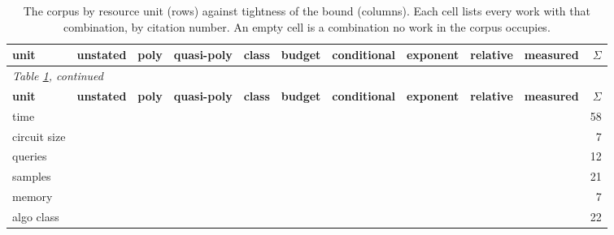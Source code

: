 \begin{landscape}
\begingroup\scriptsize\setlength{\tabcolsep}{3pt}
\begin{longtable}{lp{2.10cm}p{2.10cm}p{2.10cm}p{2.10cm}p{2.10cm}p{2.10cm}p{2.10cm}p{2.10cm}p{2.10cm}r}
\caption{The corpus by resource unit (rows) against tightness of the bound (columns). Each cell lists every work with that combination, by citation number. An empty cell is a combination no work in the corpus occupies.}\label{tab:unit-tightness}\\
\toprule \textbf{unit} & \textbf{unstated} & \textbf{poly} & \textbf{quasi-poly} & \textbf{class} & \textbf{budget} & \textbf{conditional} & \textbf{exponent} & \textbf{relative} & \textbf{measured} & \textbf{$\Sigma$} \\ \midrule\endfirsthead
\multicolumn{11}{l}{\emph{Table \ref{tab:unit-tightness}, continued}}\\
\toprule \textbf{unit} & \textbf{unstated} & \textbf{poly} & \textbf{quasi-poly} & \textbf{class} & \textbf{budget} & \textbf{conditional} & \textbf{exponent} & \textbf{relative} & \textbf{measured} & \textbf{$\Sigma$} \\ \midrule\endhead
\bottomrule\endfoot
time & \cite{ZDKT25} & \cite{BCV16,BJ23,BLPR18,CGH04,CHLX25,CK21,CKMMNST25,DGMRLW24,DKKLMS16,DN03,DNV19,EMM20,GIKKM23,GKVZ22,GKY11,GSVV25,HMST22,HMSTY25,HN23,HW21,KKOSVZ24,LZZ25,MPRV09,MR26,SZB21,Son24,VDKMR26,XSD24,ZSWB22} & \cite{BHJK25} &  & \cite{RV24,ZFWCSXZ26} & \cite{AHY25,AS24,BB20,BIS17,BRST21,DHSS25} & \cite{BSWRLW25,DLSW25,KPR25} & \cite{BCS24,BGGKRR26,BGHKP24,BRSV17,JYCDTCP21,LLW19,ZCSL24} & \cite{BAP25,BDJV22,BEGKMZ22,CCNSTT22,DJYWWMNL26,DKLP22,FJTYCDCP23,SGSGM22,SSZHTE24} & 58 \\
circuit size &  & \cite{GJMM20} & \cite{ABIKN23,BW08,GHJS25} &  & \cite{BJRZ24} & \cite{GJW22} &  & \cite{BC22} &  & 7 \\
queries &  &  &  &  & \cite{BBHS22,CCGJY20,FK24,ML24,NCM25} &  &  & \cite{ACMS23,BM09,HU14} & \cite{CCHRSS24,CGZ24,CJM20,SSSS17} & 12 \\
samples &  &  &  & \cite{DIKR25,WZDD24} & \cite{AH23,CBM18,MHS19,MHS22,ZYWGW25} &  & \cite{ADKPS24,BDKLS24,DKLM26,DLB25,DPLB24,DTAPZK24,Gla24,JKMS25,KJWSM26,LOSW24,TME25} & \cite{HSU25,NK26} & \cite{SE22} & 21 \\
memory &  &  &  &  &  & \cite{DSWZ23} & \cite{KMNS21,Raz16} & \cite{BCEQ24,DQW22,DQW23,GZ19} &  & 7 \\
algo class &  &  &  & \cite{ABM22,ABM23,AGJ21,BAHSWZ22,BBHLS21,BHKKMP16,BPR19,CGGV25,CIM19,DGKP20,DM22,DVV16,EGV25,FGRVX17,GJW20,HKKLMT26,JCBKP20,KLNRS08,SW22,WSPX24,Wei25,YHGA25} &  &  &  &  &  & 22 \\

\end{longtable}
\end{landscape}
